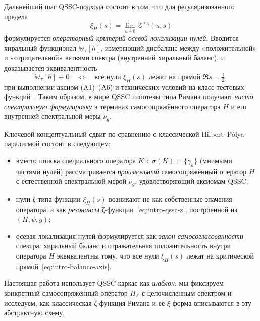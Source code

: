 \documentclass{article}
\numberwithin{equation}{section}
\theoremstyle{plain}
\theoremstyle{definition}
\theoremstyle{remark}
\begin{document}
Дальнейший шаг QSSC-подхода состоит в том, что для регуляризованного предела
\begin{equation}
\xi_H(s)
=
\lim_{u\downarrow0}\mathcal Z^{\mathrm{reg}}(u,s)
\label{eq:intro-qssc-xi}
\end{equation}
формулируется \emph{операторный критерий осевой локализации нулей}.
Вводится хиральный функционал $\mathbb W_\tau[h]$, измеряющий дисбаланс между
«положительной» и «отрицательной» ветвями спектра (внутренний хиральный
баланс), и доказывается эквивалентность
\begin{equation}
\mathbb W_\tau[h]\equiv 0
\quad\Longleftrightarrow\quad
\text{все нули }\xi_H(s)\text{ лежат на прямой }\Re s=\tfrac12,
\label{eq:intro-balance-axis}
\end{equation}
при выполнении аксиом (A1)–(A6) и технических условий на класс тестовых
функций~\cite{Monakhov-QSG-002}. Таким образом, в мире QSSC гипотезы
типа Римана получают \emph{чисто спектральную формулировку} в терминах
самосопряжённого оператора $H$ и его внутренней спектральной меры $\nu_g$.

\medskip

\noindent
Ключевой концептуальный сдвиг по сравнению с классической Hilbert--Pólya
парадигмой состоит в следующем:
\begin{itemize}[leftmargin=2.2em]
  \item вместо поиска специального оператора $K$ с
  $\sigma(K)=\{\gamma_k\}$ (мнимыми частями нулей) рассматривается
  \emph{произвольный} самосопряжённый оператор $H$ с естественной спектральной
  мерой $\nu_g$, удовлетворяющий аксиомам QSSC;

  \item нули ζ-типа функции $\xi_H(s)$ возникают не как собственные значения
  оператора, а как \emph{резонансы} ζ-функции~\eqref{eq:intro-qssc-z},
  построенной из $(H,\psi,g)$;

  \item осевая локализация нулей формулируется как \emph{закон
  самосогласованности} спектра: хиральный баланс и отражательная
  положительность внутри оператора $H$ эквивалентны тому, что все нули
  $\xi_H(s)$ лежат на критической прямой~\eqref{eq:intro-balance-axis}.
\end{itemize}

\noindent
Настоящая работа использует QSSC-каркас \cite{Monakhov-QSG-002} как
\emph{шаблон}: мы фиксируем конкретный самосопряжённый оператор
$H_{\mathbb Z}$ с целочисленным спектром и исследуем, как классическая ζ-функция
Римана и её $\xi$-форма вписываются в эту абстрактную схему.
\end{document}
